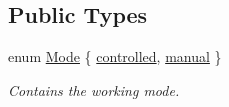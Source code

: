 \subsection*{Public Types}
\begin{DoxyCompactItemize}
\item 
enum \hyperlink{class_servo_thread_a8d581034e60792a9995d44065f6140a5}{Mode} \{ \hyperlink{class_servo_thread_a8d581034e60792a9995d44065f6140a5a6776147f492a4e0b0bb5ee4fdbc8d086}{controlled}, 
\hyperlink{class_servo_thread_a8d581034e60792a9995d44065f6140a5ae260aa6159d95b94851c96df939b51b3}{manual}
 \}
\begin{DoxyCompactList}\small\item\em Contains the working mode. \end{DoxyCompactList}\end{DoxyCompactItemize}
